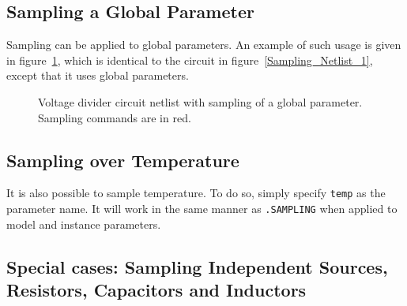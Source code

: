 \subsection{Sampling a Global Parameter}
\label{sampling_GlobalParam}

Sampling can be applied to global parameters.  An example of such usage is given 
in figure~\ref{Sampling_Netlist_3}, which is identical to the circuit in 
figure~\ref{Sampling_Netlist_1}, except that it uses global parameters.
\begin{figure}[htbp]
\begin{centering}
\caption{Voltage divider circuit netlist with sampling of a global parameter.
Sampling commands are in \color{XyceRed}red\color{black}.
\label{Sampling_Netlist_3}}
\end{centering}
\end{figure}

\subsection{Sampling over Temperature}
\label{sampling_Temperature}

It is also possible to sample temperature.  To do so, simply 
specify \verb|temp| as the parameter name.  It will work in the 
same manner as \verb|.SAMPLING| when applied to model and instance 
parameters.

\subsection{Special cases: Sampling Independent Sources, Resistors, Capacitors and Inductors}
\label{sampling_SpecialCases}

